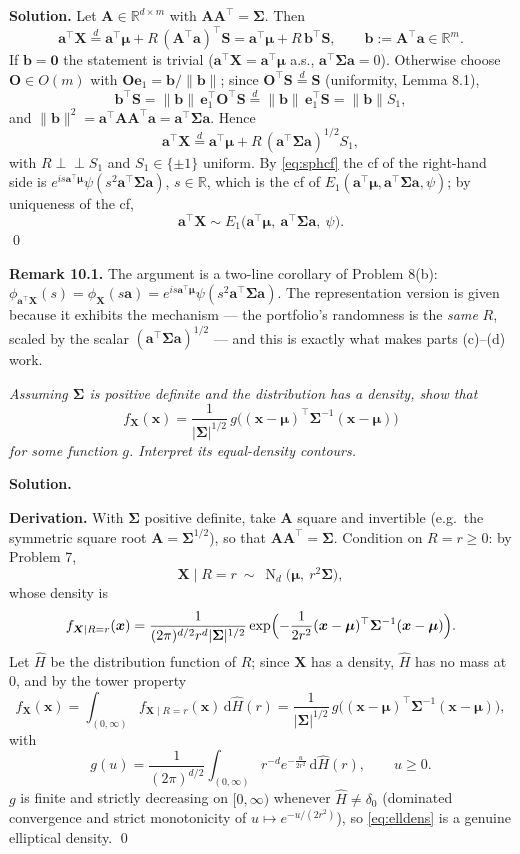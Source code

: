 \documentclass{MFM-hw} %
\newcommand{\real}{\mathbb{R}}
\newcommand{\normal}{\operatorname{N}}
\newcommand{\dd}{\,\mathrm{d}}
\newcommand{\inde}{\perp\!\!\!\perp}
\newcommand{\bX}{\bm{X}}
\newcommand{\bA}{\bm{A}}
\newcommand{\bS}{\bm{S}}
\newcommand{\bx}{\bm{x}}
\newcommand{\ba}{\bm{a}}
\newcommand{\bb}{\bm{b}}
\newcommand{\be}{\bm{e}}
\newcommand{\bO}{\bm{O}}
\newcommand{\bmu}{\bm{\mu}}
\newcommand{\bSigma}{\bm{\Sigma}}
\newcommand{\bzero}{\bm{0}}
\begin{document}
\medskip
\textbf{Solution.} Let $\bA\in\real^{d\times m}$ with $\bA\bA^\top=\bSigma$. Then
\[
    \ba^\top\bX\overset{d}{=}\ba^\top\bmu+R\,(\bA^\top\ba)^\top\bS
    =\ba^\top\bmu+R\,\bb^\top\bS,\qquad \bb:=\bA^\top\ba\in\real^m .
\]
If $\bb=\bzero$ the statement is trivial ($\ba^\top\bX=\ba^\top\bmu$ a.s., $\ba^\top\bSigma\ba=0$). Otherwise choose $\bO\in O(m)$ with $\bO\be_1=\bb/\|\bb\|$; since $\bO^\top\bS\overset{d}{=}\bS$ (uniformity, Lemma 8.1),
\[
    \bb^\top\bS=\|\bb\|\,\be_1^\top\bO^\top\bS\overset{d}{=}\|\bb\|\,\be_1^\top\bS=\|\bb\|S_1 ,
\]
and $\|\bb\|^2=\ba^\top\bA\bA^\top\ba=\ba^\top\bSigma\ba$. Hence
\[
    \ba^\top\bX\overset{d}{=}\ba^\top\bmu+R\,(\ba^\top\bSigma\ba)^{1/2}S_1,
\]
with $R\inde S_1$ and $S_1\in\{\pm1\}$ uniform. By \eqref{eq:sphcf} the cf of the right-hand side is $e^{is\ba^\top\bmu}\psi(s^2\ba^\top\bSigma\ba)$, $s\in\real$, which is the cf of $E_1(\ba^\top\bmu,\ba^\top\bSigma\ba,\psi)$; by uniqueness of the cf,
\[
    \boxed{\;\ba^\top\bX\sim E_1\bigl(\ba^\top\bmu,\ \ba^\top\bSigma\ba,\ \psi\bigr).\;}
\]
\qed

\smallskip
\noindent\textbf{Remark 10.1.} The argument is a two-line corollary of Problem 8(b): $\phi_{\ba^\top\bX}(s)=\phi_{\bX}(s\ba)=e^{is\ba^\top\bmu}\psi(s^2\ba^\top\bSigma\ba)$. The representation version is given because it exhibits the mechanism --- the portfolio's randomness is the \emph{same} $R$, scaled by the scalar $(\ba^\top\bSigma\ba)^{1/2}$ --- and this is exactly what makes parts (c)--(d) work.

\HWsubproblem
\noindent\textit{Assuming $\bSigma$ is positive definite and the distribution has a density, show that}
\[
    f_{\bX}(\bx)=\frac{1}{|\bSigma|^{1/2}}\,g\bigl((\bx-\bmu)^\top\bSigma^{-1}(\bx-\bmu)\bigr)
\]
\textit{for some function $g$. Interpret its equal-density contours.}

\medskip
\textbf{Solution.}

\smallskip
\noindent\textbf{Derivation.} With $\bSigma$ positive definite, take $\bA$ square and invertible (e.g.\ the symmetric square root $\bA=\bSigma^{1/2}$), so that $\bA\bA^\top=\bSigma$. Condition on $R=r\ge0$: by Problem 7,
\[
    \bX\mid R=r\ \sim\ \normal_d\bigl(\bmu,\ r^2\bSigma\bigr),
\]
whose density is
\[
    f_{\bX\mid R=r}(\bx)=\frac{1}{(2\pi)^{d/2}r^{d}|\bSigma|^{1/2}}\exp\Bigl(-\frac{1}{2r^2}(\bx-\bmu)^\top\bSigma^{-1}(\bx-\bmu)\Bigr).
\]
Let $\hat H$ be the distribution function of $R$; since $\bX$ has a density, $\hat H$ has no mass at $0$, and by the tower property
\begin{equation}\label{eq:elldens}
    f_{\bX}(\bx)=\int_{(0,\infty)}f_{\bX\mid R=r}(\bx)\dd\hat H(r)
    =\frac{1}{|\bSigma|^{1/2}}\,g\bigl((\bx-\bmu)^\top\bSigma^{-1}(\bx-\bmu)\bigr),
\end{equation}
with
\[
    \boxed{\;g(u)=\frac{1}{(2\pi)^{d/2}}\int_{(0,\infty)}r^{-d}e^{-\frac{u}{2r^{2}}}\dd\hat H(r),\qquad u\ge0 .\;}
\]
$g$ is finite and strictly decreasing on $[0,\infty)$ whenever $\hat H\neq\delta_0$ (dominated convergence and strict monotonicity of $u\mapsto e^{-u/(2r^2)}$), so \eqref{eq:elldens} is a genuine elliptical density. \qed
\end{document}
